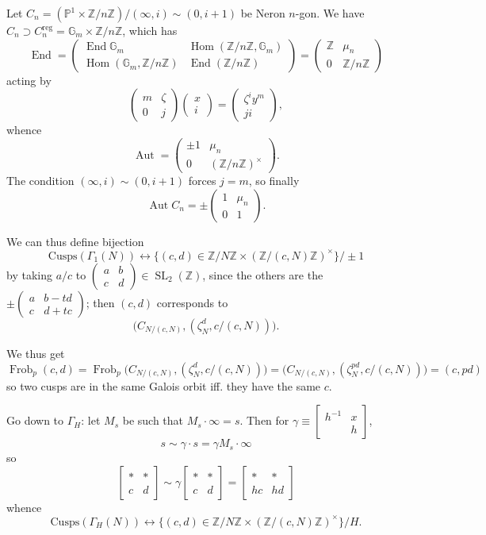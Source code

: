 \documentclass[12pt]{article}
\newcommand{\Z}{\mathbb{Z}}
\renewcommand{\P}{\mathbb{P}}
\newcommand{\G}{\mathbb{G}}
\newcommand{\SL}{\operatorname{SL}}
\newcommand{\Aut}{\operatorname{Aut}}
\newcommand{\Hom}{\operatorname{Hom}}
\newcommand{\End}{\operatorname{End}}
\newcommand{\Frob}{\operatorname{Frob}}
\newcommand{\matabcd}{\left( \begin{smallmatrix} a & b \\ c & d \end{smallmatrix} \right)}
\newcommand{\smat}[4]{\left[ \begin{smallmatrix} #1 & #2 \\ #3 & #4 \end{smallmatrix} \right]}
\theoremstyle{definition}
\begin{document}
Let $C_n = (\P^1 \times \Z/n\Z) / (\infty,i) \sim (0, i+1)$ be Neron $n$-gon. We have $C_n \supset C_n^{\text{reg}} = \G_m \times \Z/n\Z$, which has
\[ \End = \left( \begin{matrix} \End \G_m & \Hom(\Z/n\Z,\G_m) \\ \Hom(\G_m, \Z/n\Z) & \End(\Z/n\Z) \end{matrix} \right) =  \left( \begin{matrix} \Z & \mu_n \\ 0 & \Z/n\Z \end{matrix} \right) \]
acting by 
\[ \left( \begin{matrix} m & \zeta \\ 0 & j \end{matrix} \right) \left( \begin{matrix} x \\ i \end{matrix} \right)= \left( \begin{matrix} \zeta^i y^m \\ ji \end{matrix} \right),  \]
whence
\[ \Aut =  \left( \begin{matrix} \pm1 & \mu_n \\ 0 &( \Z/n\Z )^\times \end{matrix} \right). \]
The condition $(\infty,i) \sim (0, i+1)$ forces $j=m$, so finally
\[ \Aut C_n = \pm \left( \begin{matrix} 1 & \mu_n \\ 0 &1 \end{matrix} \right). \]

We can thus define bijection
\[ \text{Cusps}(\Gamma_1(N)) \longleftrightarrow \{ (c,d) \in \Z/N\Z \times (\Z/(c,N)\Z)^\times \} / \pm 1 \]
by taking $a/c$ to $\matabcd \in \SL_2(\Z)$, since the others are the $\pm \left( \begin{smallmatrix} a & b-td \\ c & d+tc \end{smallmatrix} \right)$; then $(c,d)$ corresponds to
\[ \big( C_{N/(c,N)}, (\zeta_N^d, c/(c,N) ) \big). \]

We thus get
\[ \Frob_p (c,d) = \Frob_p \big( C_{N/(c,N)}, (\zeta_N^d, c/(c,N) ) \big) = \big( C_{N/(c,N)}, (\zeta_N^{pd}, c/(c,N) ) \big) = (c,pd) \]
so two cusps are in the same Galois orbit iff. they have the same $c$.

Go down to $\Gamma_H$: let $M_s$ be such that $M_s \cdot \infty = s$. Then for $\gamma \equiv \smat{h^{-1}}{x}{}{h}$,
\[ s \sim \gamma \cdot s = \gamma M_{s} \cdot \infty \]
so
\[ \smat{*}{*}{c}{d} \sim \gamma \smat{*}{*}{c}{d} = \smat{*}{*}{hc}{hd} \]
whence
\[ \text{Cusps}(\Gamma_H(N)) \longleftrightarrow \{ (c,d) \in \Z/N\Z \times (\Z/(c,N)\Z)^\times \} / H. \]
\end{document}
